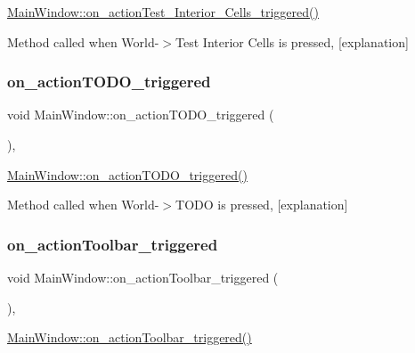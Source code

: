 \hyperlink{class_main_window_af1dd399ccee2cf368432256a4c8cfc36}{Main\+Window\+::on\+\_\+action\+Test\+\_\+\+Interior\+\_\+\+Cells\+\_\+triggered()} 

Method called when World-\/$>$Test Interior Cells is pressed, \mbox{[}explanation\mbox{]} \mbox{\label{class_main_window_ad66df2de0ccf574f449f5e7258bcdfba}} 
\subsubsection{\texorpdfstring{on\+\_\+action\+T\+O\+D\+O\+\_\+triggered}{on\_actionTODO\_triggered}}
{\footnotesize\ttfamily void Main\+Window\+::on\+\_\+action\+T\+O\+D\+O\+\_\+triggered (\begin{DoxyParamCaption}{ }\end{DoxyParamCaption})\hspace{0.3cm}{\ttfamily [private]}, {\ttfamily [slot]}}



\hyperlink{class_main_window_ad66df2de0ccf574f449f5e7258bcdfba}{Main\+Window\+::on\+\_\+action\+T\+O\+D\+O\+\_\+triggered()} 

Method called when World-\/$>$T\+O\+DO is pressed, \mbox{[}explanation\mbox{]} \mbox{\label{class_main_window_a0f037e29b645ecfd6a256136bfc1ee38}} 
\subsubsection{\texorpdfstring{on\+\_\+action\+Toolbar\+\_\+triggered}{on\_actionToolbar\_triggered}}
{\footnotesize\ttfamily void Main\+Window\+::on\+\_\+action\+Toolbar\+\_\+triggered (\begin{DoxyParamCaption}{ }\end{DoxyParamCaption})\hspace{0.3cm}{\ttfamily [private]}, {\ttfamily [slot]}}



\hyperlink{class_main_window_a0f037e29b645ecfd6a256136bfc1ee38}{Main\+Window\+::on\+\_\+action\+Toolbar\+\_\+triggered()} 

